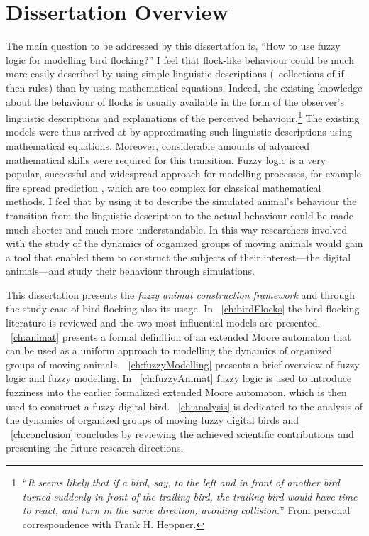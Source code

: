 \section{Dissertation Overview}
The main question to be addressed by this dissertation is, ``How to use fuzzy logic for modelling bird flocking?'' I feel that flock-like behaviour could be much more easily described by using simple linguistic descriptions (\eg\ collections of if-then rules) than by using mathematical equations. Indeed, the existing knowledge about the behaviour of flocks is usually available in the form of the observer's linguistic descriptions and explanations of the perceived behaviour.\footnote{``\emph{It seems likely that if a bird, say, to the left and in front of another bird turned suddenly in front of the trailing bird, the trailing bird would have time to react, and turn in the same direction, avoiding collision.}'' From personal correspondence with Frank H. Heppner.} The existing models were thus arrived at by approximating such linguistic descriptions using mathematical equations. Moreover, considerable amounts of advanced mathematical skills were required for this transition. Fuzzy logic \cite{zadeh:1965} is a very popular, successful and widespread approach for modelling processes, for example fire spread prediction \cite{mraz:1999,vakalis:2004a,vakalis:2004b}, which are too complex for classical mathematical methods. I feel that by using it to describe the simulated animal's behaviour the transition from the linguistic description to the actual behaviour could be made much shorter and much more understandable. In this way researchers involved with the study of the dynamics of organized groups of moving animals would gain a tool that enabled them to construct the subjects of their interest---the digital animals---and study their behaviour through simulations.

This dissertation presents the \emph{fuzzy animat construction framework} and through the study case of bird flocking also its usage. In \chaptername~\ref{ch:birdFlocks} the bird flocking literature is reviewed and the two most influential models are presented. \chaptername~\ref{ch:animat} presents a formal definition of an extended Moore automaton that can be used as a uniform approach to modelling the dynamics of organized groups of moving animals. \chaptername~\ref{ch:fuzzyModelling} presents a brief overview of fuzzy logic and fuzzy modelling. In \chaptername~\ref{ch:fuzzyAnimat} fuzzy logic is used to introduce fuzziness into the earlier formalized extended Moore automaton, which is then used to construct a fuzzy digital bird. \chaptername~\ref{ch:analysis} is dedicated to the analysis of the dynamics of organized groups of moving fuzzy digital birds and \chaptername~\ref{ch:conclusion} concludes by reviewing the achieved scientific contributions and presenting the future research directions.

